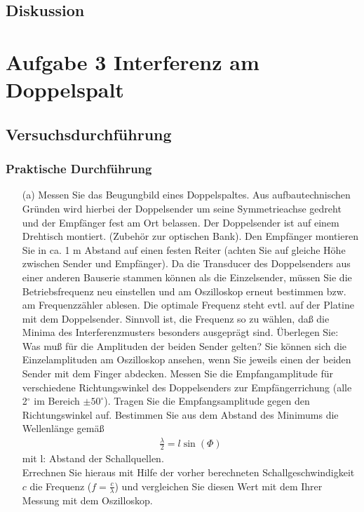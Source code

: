\documentclass[12pt]{scrartcl}
\begin{document}
\subsection{Diskussion}
\section{Aufgabe 3 Interferenz am Doppelspalt}
\subsection{Versuchsdurchführung}
\subsubsection{Praktische Durchführung}
\begin{itemize}
\item[(a)]
Messen Sie das Beugungbild eines Doppelspaltes. Aus aufbautechnischen Gründen wird hierbei der Doppelsender um seine Symmetrieachse gedreht und der Empfänger fest am Ort belassen. Der Doppelsender ist auf einem Drehtisch montiert. (Zubehör zur optischen Bank). Den Empfänger montieren Sie
in ca. 1 m Abstand auf einen festen Reiter (achten Sie auf gleiche Höhe zwischen Sender und Empfänger). Da die Transducer des Doppelsenders aus einer anderen Bauserie stammen können als die Einzelsender, müssen Sie die Betriebsfrequenz neu einstellen und am Oszilloskop erneut bestimmen bzw. am Frequenzzähler ablesen. Die optimale Frequenz steht evtl. auf der Platine mit dem Doppelsender. Sinnvoll ist, die Frequenz so zu wählen, daß die Minima des Interferenzmusters
besonders ausgeprägt sind. Überlegen Sie: Was muß für die Amplituden der beiden Sender gelten? Sie können sich die Einzelamplituden am Oszilloskop ansehen, wenn Sie jeweils einen der beiden Sender mit dem Finger abdecken.
Messen Sie die Empfangamplitude für verschiedene Richtungswinkel des Doppelsenders zur Empfängerrichung (alle 2$^{\circ}$ im Bereich $\pm 50^{\circ}$). Tragen Sie die Empfangsamplitude gegen den Richtungswinkel auf. Bestimmen Sie aus dem Abstand des Minimums die Wellenlänge gemäß
\begin{align}
\frac{\lambda}{2} = l\sin(\Phi)
\end{align}
mit l: Abstand der Schallquellen.\\
Errechnen Sie hieraus mit Hilfe der vorher berechneten Schallgeschwindigkeit $c$ die Frequenz ($f = \frac{c}{\lambda}$) und vergleichen Sie diesen Wert mit dem Ihrer Messung mit dem Oszilloskop.
\end{itemize}
\end{document}
